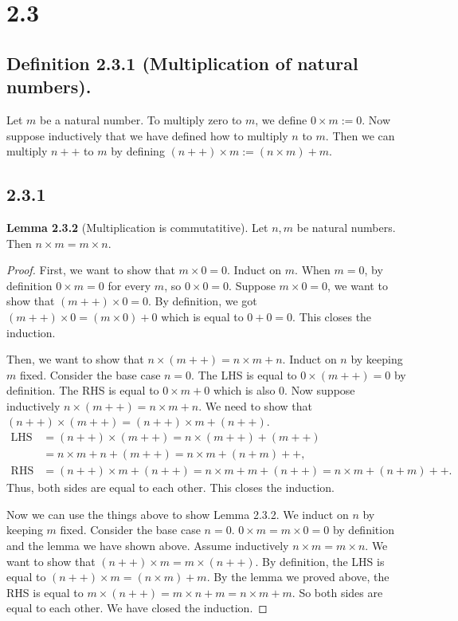 \documentclass[12pt, letter]{article}
\begin{document}
\section*{2.3}
\subsection*{Definition 2.3.1 (Multiplication of natural numbers).}
Let $m$ be a natural number. To multiply zero to $m$, we define $0\times m:=0$. Now suppose inductively that we have defined how to multiply $n$ to $m$. Then we can multiply $n++$ to $m$ by defining $(n++)\times m:=(n\times m)+m$.
\subsection*{2.3.1}
\textbf{Lemma 2.3.2} (Multiplication is commutatitive). Let $n,m$ be natural numbers. Then $n\times m=m\times n$.
\begin{proof}
    First, we want to show that $m\times 0=0$. Induct on $m$. When $m=0$, by definition $0\times m=0$ for every $m$, so $0\times 0=0$. Suppose $m\times 0=0$, we want to show that $(m++)\times 0=0$. By definition, we got $(m++)\times 0=(m\times 0)+0$ which is equal to $0+0=0$. 
    This closes the induction.

    Then, we want to show that $n\times(m++)=n\times m+n$. Induct on $n$ by keeping $m$ fixed. Consider the base case $n=0$. The LHS is equal to $0\times(m++)=0$ by definition. The RHS is equal to 
    $0\times m+0$ which is also 0. Now suppose inductively $n\times (m++)=n\times m+n$. We need to show that $(n++)\times (m++)=(n++)\times m+(n++)$. 
    \begin{equation*}
        \begin{aligned}
            \text{LHS}&=(n++)\times(m++)=n\times (m++)+(m++)\\&=n\times m+n+(m++)=n\times m+(n+m)++,\\
            \text{RHS}&=(n++)\times m+(n++)=n\times m+m+(n++)=n\times m+(n+m)++.
        \end{aligned}
    \end{equation*}
    Thus, both sides are equal to each other. This closes the induction.

    Now we can use the things above to show Lemma 2.3.2. We induct on $n$ by keeping $m$ fixed. Consider the base case $n=0$. $0\times m=m\times 0=0$ by definition and the lemma we have shown above. Assume inductively $n\times m = m\times n$. We want to show that 
    $(n++)\times m=m\times (n++)$. By definition, the LHS is equal to $(n++)\times m=(n\times m)+m$. By the lemma we proved above, the RHS is equal to $m\times(n++)=m\times n+m=n\times m+m$. So both sides are equal to each other. We have closed the induction.  
\end{proof}
\end{document}
